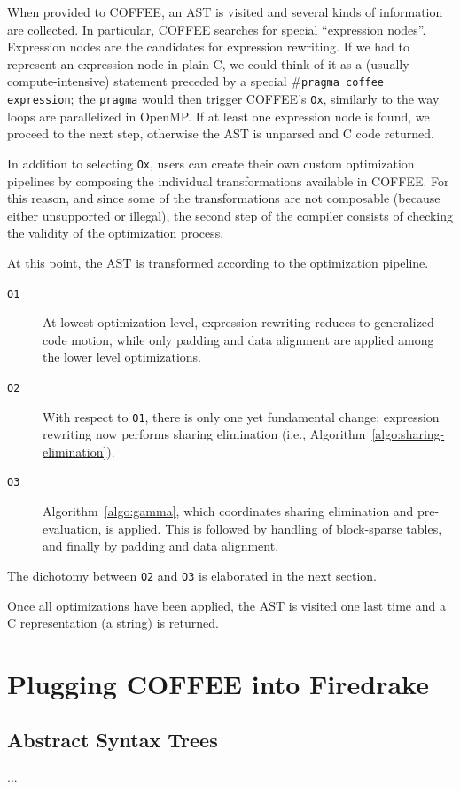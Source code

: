 When provided to COFFEE, an AST is visited and several kinds of information are collected. In particular, COFFEE searches for special ``expression nodes''. Expression nodes are the candidates for expression rewriting. If we had to represent an expression node in plain C, we could think of it as a (usually compute-intensive) statement preceded by a special \texttt{$\#$pragma coffee expression}; the \texttt{pragma} would then trigger COFFEE's \texttt{Ox}, similarly to the way loops are parallelized in OpenMP. If at least one expression node is found, we proceed to the next step, otherwise the AST is unparsed and C code returned.

In addition to selecting \texttt{Ox}, users can create their own custom optimization pipelines by composing the individual transformations available in COFFEE. For this reason, and since some of the transformations are not composable (because either unsupported or illegal), the second step of the compiler consists of checking the validity of the optimization process. 

At this point, the AST is transformed according to the optimization pipeline. 
\begin{description}
\item[\texttt{O1}] At lowest optimization level, expression rewriting reduces to generalized code motion, while only padding and data alignment are applied among the lower level optimizations.
\item[\texttt{O2}] With respect to \texttt{O1}, there is only one yet fundamental change: expression rewriting now performs sharing elimination (i.e., Algorithm~\ref{algo:sharing-elimination}).
\item[\texttt{O3}] Algorithm~\ref{algo:gamma}, which coordinates sharing elimination and pre-evaluation, is applied. This is followed by handling of block-sparse tables, and finally by padding and data alignment. 
\end{description}
The dichotomy between \texttt{O2} and \texttt{O3} is elaborated in the next section.

Once all optimizations have been applied, the AST is visited one last time and a C representation (a string) is returned.

\section{Plugging COFFEE into Firedrake}
\label{sec:coffee-implementation}

\subsection{Abstract Syntax Trees}
...

